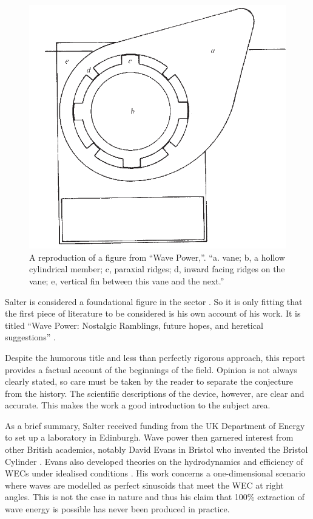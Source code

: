 \documentclass{report}
\begin{document}
\begin{figure}
\centering
\includegraphics[scale=0.25]{graphics/duck}
\caption{A reproduction of a figure from ``Wave Power,''\cite{salterDuck}. ``a. vane; b, a hollow cylindrical member; c, paraxial ridges; d, inward facing ridges on the vane; e, vertical fin between this vane and the next.''}
\label{fig:duck}
\end{figure}

Salter is considered a foundational figure in the sector \cite{gorinevsky2005a}. So it is only fitting that the first piece of literature to be considered is his own account of his work. It is titled ``Wave Power: Nostalgic Ramblings, future hopes, and heretical suggestions'' \cite{salterRamble}.

Despite the humorous title and less than perfectly rigorous approach, this report provides a factual account of the beginnings of the field. Opinion is not always clearly stated, so care must be taken by the reader to separate the conjecture from the history. The scientific descriptions of the device, however, are clear and accurate. This makes the work a good introduction to the subject area. 

As a brief summary, Salter received funding from the UK Department of Energy to set up a laboratory in Edinburgh. Wave power then garnered interest from other British academics, notably David Evans in Bristol who invented the Bristol Cylinder \cite{evans1979a}. Evans also developed theories on the hydrodynamics and efficiency of WECs under idealised conditions \cite{evans1976a}. His work concerns a one-dimensional scenario where waves are modelled as perfect sinusoids that meet the WEC at right angles. This is not the case in nature and thus his claim that 100\% extraction of wave energy is possible has never been produced in practice.
\end{document}
